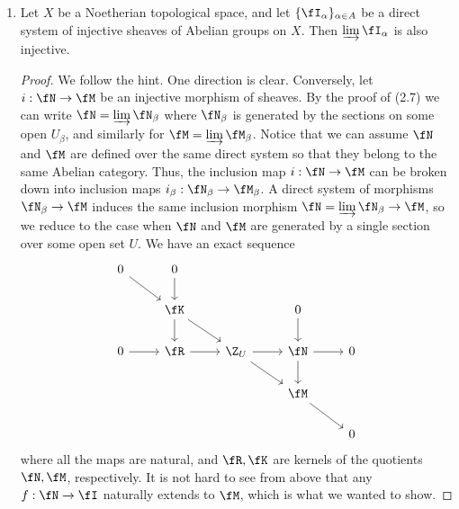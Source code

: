 \documentclass[a4paper]{article}
\begin{document}
\begin{enumerate} [label=\textbf{\arabic*.}, leftmargin=0em]
    \item[\textbf{6.}] Let $X$ be a Noetherian topological space, and let $\{ \fI_\alpha \}_{\alpha \in A}$ be a direct system of injective sheaves of Abelian groups on $X$. Then $\varinjlim \fI _\alpha$ is also injective.

          \begin{proof}
              We follow the hint. One direction is clear. Conversely, let $i : \fN \to \fM$ be an injective morphism of sheaves. By the proof of (2.7) we can write $\fN = \varinjlim \fN_\beta$ where $\fN_\beta$ is generated by the sections on some open $U_\beta$, and similarly for $\fM = \varinjlim \fM_\beta$. Notice that we can assume $\fN$ and $\fM$ are defined over the same direct system so that they belong to the same Abelian category. Thus, the inclusion map $i : \fN \to \fM$ can be broken down into inclusion maps $i_\beta : \fN_\beta \to \fM_\beta$. A direct system of morphisms $\fN_\beta \to \fM$ induces the same inclusion morphism $\fN = \varinjlim \fN_\beta \to \fM$, so we reduce to the case when $\fN$ and $\fM$ are generated by a single section over some open set $U$. We have an exact sequence
              \[ \begin{tikzcd}
                      0 \arrow[rd] & 0 \arrow[d]              &                           &                         &   \\
                      & \fK \arrow[rd] \arrow[d] &                           & 0 \arrow[d]             &   \\
                      0 \arrow[r]  & \fR \arrow[r]            & \Z_U \arrow[r] \arrow[rd] & \fN \arrow[r] \arrow[d] & 0 \\
                      &                          &                           & \fM \arrow[rd]          &   \\
                      &                          &                           &                         & 0
                  \end{tikzcd} \]
              where all the maps are natural, and $\fR, \fK$ are kernels of the quotients $\fN, \fM$, respectively. It is not hard to see from above that any $f : \fN \to \fI$ naturally extends to $\fM$, which is what we wanted to show.


\end{proof}
\end{enumerate}
\end{document}

